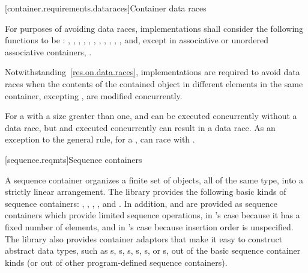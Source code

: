 [container.requirements.dataraces]{Container data races}

\pnum
For purposes of avoiding data races, implementations shall
consider the following functions to be : , ,
, , , , , ,
, , ,  and, except in
associative or unordered associative containers, .

\pnum
Notwithstanding~\ref{res.on.data.races}, implementations are required to avoid data
races when the contents of the contained object in different elements in the same
container, excepting , are modified concurrently.

\pnum
\begin{note}
For a  with a size greater than one, 
and  can be executed concurrently without a data race, but
 and  executed concurrently can result in a data
race.
As an exception to the general rule, for a , 
can race with .
\end{note}

[sequence.reqmts]{Sequence containers}

\pnum
A sequence container organizes a finite set of objects, all of the same type, into a strictly
linear arrangement. The library provides the following basic kinds of sequence containers:
, ,
, , and .
In addition,
 and  are provided as sequence containers
which provide limited sequence operations,
in 's case because it has a fixed number of elements, and
in 's case because insertion order is unspecified.
The library also provides container adaptors that
make it easy to construct abstract data types,
such as s,
s,
s,
s,
s, or
s, out of
the basic sequence container kinds (or out of other program-defined sequence containers).

